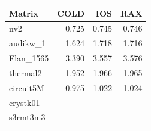 \begin{table}[htbp]
  \centering
  \label{tab:methodology_x86}
  \begin{tabular}{lrrr}
    \toprule
    \textbf{Matrix} & \textbf{COLD} & \textbf{IOS} & \textbf{RAX} \\
    \midrule
    nv2 & 0.725 & 0.745 & 0.746 \\
    audikw\_1 & 1.624 & 1.718 & 1.716 \\
    Flan\_1565 & 3.390 & 3.557 & 3.576 \\
    thermal2 & 1.952 & 1.966 & 1.965 \\
    circuit5M & 0.975 & 1.022 & 1.024 \\
    crystk01 & -- & -- & -- \\
    s3rmt3m3 & -- & -- & -- \\
    \bottomrule
  \end{tabular}
\end{table}